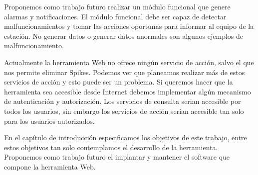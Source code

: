 \begin{description}[style=unboxed,leftmargin=0cm,labelwidth=1cm]
				Proponemos como trabajo futuro realizar un módulo funcional que genere alarmas y notificaciones. El módulo funcional
				debe ser capaz de detectar malfuncionamientos y tomar las acciones oportunas para informar al equipo de la estación.
				No generar datos o generar datos anormales son algunos ejemplos de malfuncionamiento.
			\item[Autenticación y autorización]
				Actualmente la herramienta Web no ofrece ningún servicio de acción, salvo el que nos permite eliminar Spikes. Podemos
				ver que planeamos realizar más de estos servicios de acción y esto puede ser un problema. Si queremos hacer que la
				herramienta sea accesible desde Internet debemos implementar algún mecanismo de autenticación y autorización. Los
				servicios de consulta serian accesible por todos los usuarios, sin embargo los servicios de acción serian accesible
				tan solo para los usuarios autorizados.
			\item[Implantación y Mantenimiento]
				En el capítulo de introducción especificamos los objetivos de este trabajo, entre estos objetivos tan solo
				contemplamos el desarrollo de la herramienta. Proponemos como trabajo futuro el implantar y mantener el software que
				compone la herramienta Web. 

			
		\end{description}
